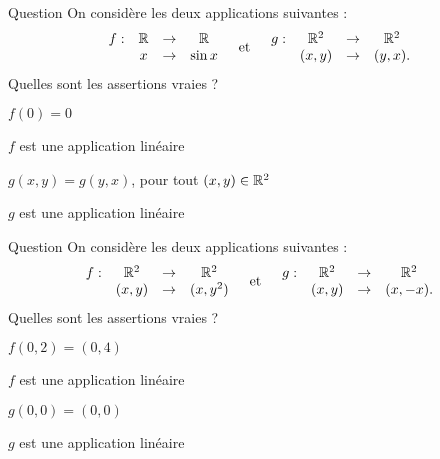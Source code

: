 

\begin{multi}[multiple,feedback=
{\(f\) n'est pas linéaire car \(f(\pi)=f(\frac{\pi}{2}+ \frac{\pi}{2})=0\) 
et \(f(\frac{\pi}{2})+ f(\frac{\pi}{2}) =2\). 
On vérifie que \(g\) est linéaire.  
}]{Question}
On considère les deux applications suivantes : 
\[\begin{array}{rccc}f:&\mathbb{R}&\to&\mathbb{R}\\
& x&\to & \sin x \end{array} \quad \mbox{et} \quad \begin{array}{rccc}g:&\mathbb{R}^2&\to&\mathbb{R}^2\\
& (x,y)&\to &(y,x). \end{array}\] 
Quelles sont les assertions vraies ?

    \item* \(f(0)=0\)
    \item \(f\) est une application linéaire
    \item \(g(x,y) =  g(y,x)\), pour tout \((x,y) \in \mathbb{R}^2\)
    \item* \(g\) est une application linéaire
\end{multi}


\begin{multi}[multiple,feedback=
{L'application \(f\) n'est pas linéaire. Contre-exemple : \(f(2(0,1))=f(0,2)=(0,4)\) et \(2f(0,1)=(0,2)\). On vérifie que l'application \(g\) est linéaire.
}]{Question}
On considère les deux applications suivantes : 
\[\begin{array}{rccc}f:&\mathbb{R}^2&\to&\mathbb{R}^2\\
& (x,y)&\to & (x,y^2) \end{array} \quad \mbox{et} \quad \begin{array}{rccc}g:&\mathbb{R}^2&\to&\mathbb{R}^2\\
& (x,y)&\to &(x,-x). \end{array}\] 
Quelles sont les assertions vraies ?

    \item* \(f(0,2)=(0,4)\)
    \item \(f\) est une application linéaire
    \item* \(g(0,0)=(0,0)\)
    \item* \(g\) est une application linéaire
\end{multi}


